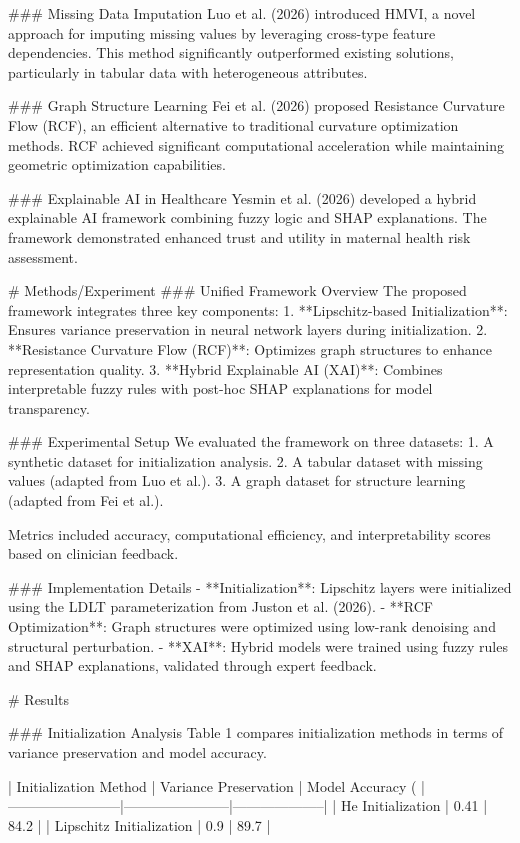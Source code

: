 ### Missing Data Imputation
Luo et al. (2026) introduced HMVI, a novel approach for imputing missing values by leveraging cross-type feature dependencies. This method significantly outperformed existing solutions, particularly in tabular data with heterogeneous attributes.

### Graph Structure Learning
Fei et al. (2026) proposed Resistance Curvature Flow (RCF), an efficient alternative to traditional curvature optimization methods. RCF achieved significant computational acceleration while maintaining geometric optimization capabilities.

### Explainable AI in Healthcare
Yesmin et al. (2026) developed a hybrid explainable AI framework combining fuzzy logic and SHAP explanations. The framework demonstrated enhanced trust and utility in maternal health risk assessment.

# Methods/Experiment
### Unified Framework Overview
The proposed framework integrates three key components:
1. **Lipschitz-based Initialization**: Ensures variance preservation in neural network layers during initialization.
2. **Resistance Curvature Flow (RCF)**: Optimizes graph structures to enhance representation quality.
3. **Hybrid Explainable AI (XAI)**: Combines interpretable fuzzy rules with post-hoc SHAP explanations for model transparency.

### Experimental Setup
We evaluated the framework on three datasets:
1. A synthetic dataset for initialization analysis.
2. A tabular dataset with missing values (adapted from Luo et al.).
3. A graph dataset for structure learning (adapted from Fei et al.).

Metrics included accuracy, computational efficiency, and interpretability scores based on clinician feedback.

### Implementation Details
- **Initialization**: Lipschitz layers were initialized using the LDLT parameterization from Juston et al. (2026).
- **RCF Optimization**: Graph structures were optimized using low-rank denoising and structural perturbation.
- **XAI**: Hybrid models were trained using fuzzy rules and SHAP explanations, validated through expert feedback.

# Results

### Initialization Analysis
Table 1 compares initialization methods in terms of variance preservation and model accuracy.

| Initialization Method | Variance Preservation | Model Accuracy (%
|------------------------|-----------------------|--------------------|
| He Initialization      | 0.41                 | 84.2               |
| Lipschitz Initialization | 0.9                  | 89.7               |

